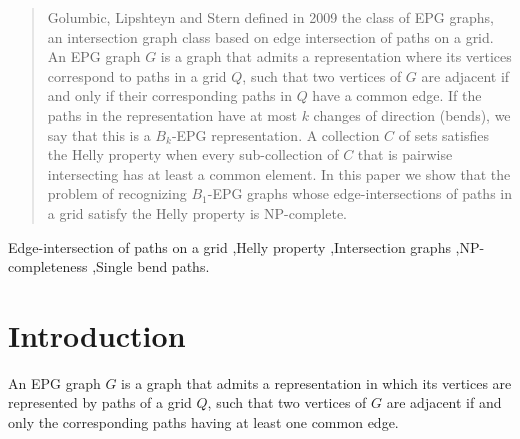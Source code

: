 \documentclass[9pt]{entcs}
\begin{document}
\begin{frontmatter}


\begin{abstract}
Golumbic, Lipshteyn and Stern defined in 2009 the class of EPG graphs, an intersection graph class  based on edge intersection of paths on a grid. An EPG graph $G$ is a graph that admits a representation where its vertices correspond to paths in a grid $Q$, such that two vertices of $G$ are adjacent if and only if their corresponding paths in $Q$ have a common edge. If the paths in the representation have at most $k$ changes of direction  (bends), we say that this is a  $B_k$-EPG representation. A collection $C$ of sets satisfies the Helly property when every sub-collection of $C$ that is pairwise intersecting has at least a common element. In this paper we show that the problem of recognizing $B_1$-EPG graphs whose edge-intersections of paths in a grid satisfy the Helly property is NP-complete.  
\end{abstract}

\begin{keyword}
Edge-intersection of paths on a grid \sep Helly property \sep Intersection graphs \sep NP-completeness \sep Single bend paths.


\end{keyword}

\end{frontmatter}


\section{Introduction}
An EPG graph $G$ is a graph that admits a representation in which its vertices are represented by paths of a grid $Q$, such that two vertices of $G$ are adjacent if and only the corresponding paths having at least one common edge. 
\end{document}
